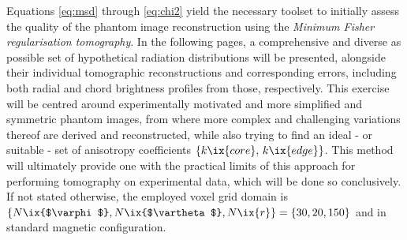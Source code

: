        Equations \ref{eq:msd} through \ref{eq:chi2} yield the necessary toolset to initially assess the quality of the phantom image reconstruction using the \textit{Minimum Fisher regularisation tomography}. In the following pages, a comprehensive and diverse as possible set of hypothetical radiation distributions will be presented, alongside their individual tomographic reconstructions and corresponding errors, including both radial and chord brightness profiles from those, respectively. This exercise will be centred around experimentally motivated and more simplified and symmetric phantom images, from where more complex and challenging variations thereof are derived and reconstructed, while also trying to find an ideal - or suitable - set of anisotropy coefficients $\left\{k\ix{core},\,k\ix{edge}\right\}$. This method will ultimately provide one with the practical limits of this approach for performing tomography on experimental data, which will be done so conclusively. If not stated otherwise, the employed voxel grid domain is $\left\{N\ix{$\varphi$},N\ix{$\vartheta$},N\ix{r}\right\}=\left\{30,20,150\right\}$ and in standard magnetic configuration.%
%
